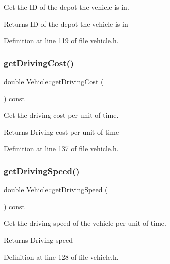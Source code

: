 Get the ID of the depot the vehicle is in. \begin{DoxyReturn}{Returns}
ID of the depot the vehicle is in 
\end{DoxyReturn}


Definition at line 119 of file vehicle.\+h.

\mbox{\label{class_vehicle_af242c980b1bfbc56d27ae4184c0f32c9}} 
\subsubsection{\texorpdfstring{get\+Driving\+Cost()}{getDrivingCost()}}
{\footnotesize\ttfamily double Vehicle\+::get\+Driving\+Cost (\begin{DoxyParamCaption}{ }\end{DoxyParamCaption}) const\hspace{0.3cm}{\ttfamily [inline]}}

Get the driving cost per unit of time. \begin{DoxyReturn}{Returns}
Driving cost per unit of time 
\end{DoxyReturn}


Definition at line 137 of file vehicle.\+h.

\mbox{\label{class_vehicle_ac42193823beeb27ad51a8d78a541f970}} 
\subsubsection{\texorpdfstring{get\+Driving\+Speed()}{getDrivingSpeed()}}
{\footnotesize\ttfamily double Vehicle\+::get\+Driving\+Speed (\begin{DoxyParamCaption}{ }\end{DoxyParamCaption}) const\hspace{0.3cm}{\ttfamily [inline]}}

Get the driving speed of the vehicle per unit of time. \begin{DoxyReturn}{Returns}
Driving speed 
\end{DoxyReturn}


Definition at line 128 of file vehicle.\+h.

\mbox{\label{class_vehicle_a6bda1a96e5899e343ca77250bd981ce2}} 

